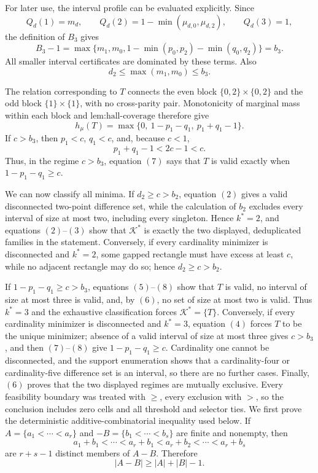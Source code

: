 For later use, the interval profile can be evaluated explicitly.  Since
\[
Q_d(1)=m_d,\qquad Q_d(2)=1-\min(\mu_{d,0},\mu_{d,2}),\qquad Q_d(3)=1,
\]
the definition of \(B_3\) gives
\[
B_3-1
=\max\{m_1,m_0,1-\min(p_0,p_2)-\min(q_0,q_2)\}=b_3. \tag{5}
\]
All smaller interval certificates are dominated by these terms.  Also
\[
d_2\leq\max(m_1,m_0)\leq b_3. \tag{6}
\]

The relation corresponding to \(T\) connects the even block \(\{0,2\}\times\{0,2\}\) and the odd block \(\{1\}\times\{1\}\), with no cross-parity pair.  Monotonicity of marginal mass within each block and \(\text{lem:hall-coverage}\) therefore give
\[
h_{\mu}(T)=\max\{0,\ 1-p_1-q_1,\ p_1+q_1-1\}. \tag{7}
\]
If \(c>b_3\), then \(p_1<c\), \(q_1<c\), and, because \(c<1\),
\[
p_1+q_1-1<2c-1<c. \tag{8}
\]
Thus, in the regime \(c>b_3\), equation \((7)\) says that \(T\) is valid exactly when \(1-p_1-q_1\geq c\).

We can now classify all minima.  If \(d_2\geq c>b_2\), equation \((2)\) gives a valid disconnected two-point difference set, while the calculation of \(b_2\) excludes every interval of size at most two, including every singleton.  Hence \(k^*=2\), and equations \((2)\)--\((3)\) show that \(\mathcal K^*\) is exactly the two displayed, deduplicated families in the statement.  Conversely, if every cardinality minimizer is disconnected and \(k^*=2\), some gapped rectangle must have excess at least \(c\), while no adjacent rectangle may do so; hence \(d_2\geq c>b_2\).

If \(1-p_1-q_1\geq c>b_3\), equations \((5)\)--\((8)\) show that \(T\) is valid, no interval of size at most three is valid, and, by \((6)\), no set of size at most two is valid.  Thus \(k^*=3\) and the exhaustive classification forces \(\mathcal K^*=\{T\}\).  Conversely, if every cardinality minimizer is disconnected and \(k^*=3\), equation \((4)\) forces \(T\) to be the unique minimizer; absence of a valid interval of size at most three gives \(c>b_3\), and then \((7)\)--\((8)\) give \(1-p_1-q_1\geq c\).  Cardinality one cannot be disconnected, and the support enumeration shows that a cardinality-four or cardinality-five difference set is an interval, so there are no further cases.  Finally, \((6)\) proves that the two displayed regimes are mutually exclusive.  Every feasibility boundary was treated with \(\geq\), every exclusion with \(>\), so the conclusion includes zero cells and all threshold and selector ties.
We first prove the deterministic additive-combinatorial inequality used below.  If \(A=\{a_1<\cdots<a_r\}\) and \(-B=\{b_1<\cdots<b_s\}\) are finite and nonempty, then
\[
a_1+b_1<\cdots<a_r+b_1<a_r+b_2<\cdots<a_r+b_s
\]
are \(r+s-1\) distinct members of \(A-B\).  Therefore
\[
|A-B|\geq|A|+|B|-1. \tag{1}
\]

